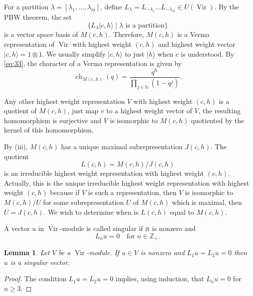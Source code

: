 \documentclass[a4paper, 12pt, reqno]{amsart}
\newtheorem{lemma}[theorem]{Lemma}
\theoremstyle{remark}
\numberwithin{equation}{subsection}
\DeclareMathOperator{\Vir}{Vir}
\DeclareMathOperator{\ch}{ch}
\begin{document}
For a partition $\lambda = [\lambda_1, \dots, \lambda_m]$, define $L_{\lambda} = L_{-\lambda_1}\dots L_{-\lambda_m} \in U(\Vir)$.
By the PBW theorem, the set
\begin{equation*}
  \{L_\lambda|c,h\rangle \mid \lambda\text{ is a partition}\}
\end{equation*}
is a vector space basis of $M(c, h)$.
Therefore, $M(c, h)$ is a Verma representation of $\Vir$ with highest weight $(c, h)$ and highest weight vector $|c, h\rangle = 1\otimes1$.
We usually simplify $|c, h\rangle$ to just $|h\rangle$ when $c$ is understood.
By \eqref{eq:33}, the character of a Verma representation is given by
\begin{equation*}
  \ch_{M(c, h)}(q) = \frac{q^h}{\prod_{j \in \mathbb{N}}(1 - q^j)}.
\end{equation*}

Any other highest weight representation $V$ with highest weight $(c, h)$ is a quotient of $M(c, h)$, just map $v$ to a highest weight vector of $V$, the resulting homomorphism is surjective and $V$ is isomorphic to $M(c, h)$ quotiented by the kernel of this homomorphism.

By (iii), $M(c, h)$ has a unique maximal subrepresentation $J(c, h)$.
The quotient
\begin{equation*}
  L(c, h) = M(c, h)/J(c, h)
\end{equation*}
is an irreducible highest weight representation with highest weight $(c, h)$.
Actually, this is the unique irreducible highest weight representation with highest weight $(c, h)$ because if $V$ is such a representation, then $V$ is isomorphic to $M(c, h)/U$ for some subrepresentation $U$ of $M(c, h)$ which is maximal, then $U = J(c, h)$.
We wish to determine when is $L(c, h)$ equal to $M(c, h)$.

A vector $u$ in $\Vir$-module is called singular if it is nonzero and
\begin{equation}
  \label{eq:34}
  L_nu = 0 \quad \text{for }n \in \mathbb{Z}_+.
\end{equation}

\begin{lemma}
  \label{lmm:10}
  Let $V$ be a $\Vir$-module.
  If $u \in V$ is nonzero and $L_1u = L_2u = 0$ then $u$ is a singular vector. 
\end{lemma}

\begin{proof}
  The condition $L_1u = L_2u = 0$ implies, using induction, that $L_nu = 0$ for $n \ge 3$.
\end{proof}
\end{document}

